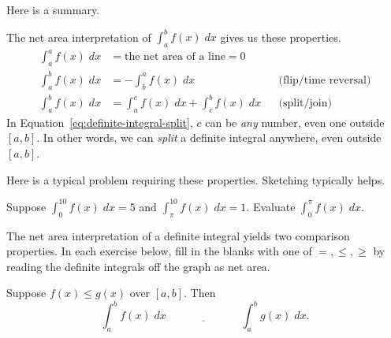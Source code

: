 \documentclass[../main.tex]{subfiles}
\begin{document}

\bigskip



\blanks*
\clearpage

Here is a summary.
\begin{thm} \label{thm:definite-integrals-properties}
  The net area interpretation of \(\int_{a}^{b} f(x)\;dx\) gives us these properties.
  \begin{align}
    \int_{a}^{a} f(x) \;dx &=   \text{the net area of a line} = 0 \\[1ex]
    \int_{a}^{b} f(x) \;dx &= - \int_{b}^{a} f(x) \;dx 
                           &&\text{(flip/time reversal)} \label{eq:definite-integral-flip} \\[1ex]
    \int_{a}^{b} f(x) \;dx &=   \int_{a}^{c} f(x) \;dx + \int_{c}^{b} f(x) \;dx 
                           &&\text{(split/join)} \label{eq:definite-integral-split}
  \end{align}
  In Equation~\eqref{eq:definite-integral-split}, \(c\) can be \emph{any} number, even one outside \([a,b]\). In other words, we can \emph{split} a definite integral anywhere, even outside \([a,b]\). 

\end{thm}

Here is a typical problem requiring these properties. Sketching typically helps.
\begin{example} \label{ex:definite-integral-split}
  Suppose \(\int_{0}^{10} f(x) \;dx = 5\) and \(\int_{\pi}^{10} f(x) \;dx = 1\). Evaluate \(\int_{0}^{\pi} f(x) \;dx\).

  \blanks*
\end{example}
\clearpage

The net area interpretation of a definite integral yields two comparison properties. In each exercise below, fill in the blanks with one of \(=, \le , \ge\) by reading the definite integrals off the graph as net area.

\begin{exercise} \label{ex:comparison-functions}
  Suppose \(f(x) \le g(x)\) over \([a,b]\). Then
  \[
    \int_{a}^{b} f(x) \;dx \quad\underline{\hspace{2cm}}\quad \int_{a}^{b} g(x) \;dx.
  \]

  \begin{center}
    
  \end{center}

\end{exercise}
\end{document}
